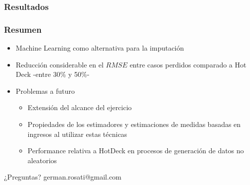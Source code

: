 \documentclass{beamer}
\begin{document}
\subsubsection{Resultados}
\begin{frame}
	\frametitle{Resumen}
	\begin{itemize}
		\item Machine Learning como alternativa para la imputación
		\item Reducción considerable en el $RMSE$ entre casos perdidos comparado a Hot Deck -entre 30\% y 50\%-
		\item Problemas a futuro
		\begin{itemize}
			\item Extensión del alcance del ejercicio
			\item Propiedades de los estimadores y estimaciones de medidas basadas en ingresos al utilizar estas técnicas
			\item Performance relativa a HotDeck en procesos de generación de datos no aleatorios
		\end{itemize}
	\end{itemize}
\end{frame}

\begin{frame}
	\begin{center}
	{\huge ¿Preguntas?
		\linebreak
		\linebreak
		\linebreak
		\linebreak}
	{\Large
		\color{blue}
		german.rosati@gmail.com
	}
	\end{center}
\end{frame}
\end{document}
